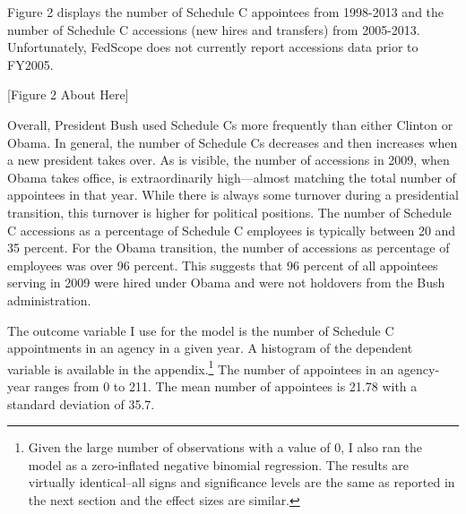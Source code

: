 \documentclass[12pt]{article}
\begin{document}
Figure 2 displays the number of Schedule C appointees from 1998-2013 and the number of Schedule C accessions (new hires and transfers) from 2005-2013. Unfortunately, FedScope does not currently report accessions data prior to FY2005. 

\begin{center}[Figure 2 About Here]\end{center}

Overall, President Bush used Schedule Cs more frequently than either Clinton or Obama. In general, the number of Schedule Cs decreases and then increases when a new president takes over. As is visible, the number of accessions in 2009, when Obama takes office, is extraordinarily high---almost matching the total number of appointees in that year. While there is always some turnover during a presidential transition, this turnover is higher for political positions. The number of Schedule C accessions as a percentage of Schedule C employees is typically between 20 and 35 percent. For the Obama transition, the number of accessions as percentage of employees was over 96 percent. This suggests that 96 percent of all appointees serving in 2009 were hired under Obama and were not holdovers from the Bush administration.

The outcome variable I use for the model is the number of Schedule C appointments in an agency in a given year. A histogram of the dependent variable is available in the appendix.\footnote{Given the large number of observations with a value of 0, I also ran the model as a zero-inflated negative binomial regression. The results are virtually identical--all signs and significance levels are the same as reported in the next section and the effect sizes are similar.} The number of appointees in an agency-year ranges from 0 to 211. The mean number of appointees is 21.78 with a standard deviation of 35.7.
\end{document}
